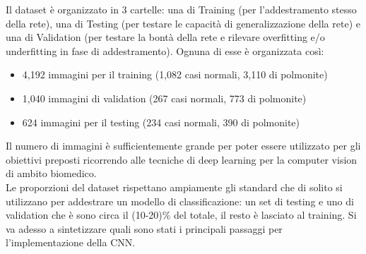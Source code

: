 Il dataset è organizzato in 3 cartelle: una di Training (per l'addestramento stesso della rete), una di Testing (per testare le capacità di generalizzazione della rete) e una di Validation (per testare la bontà della rete e rilevare overfitting e/o underfitting in fase di addestramento). Ognuna di esse è organizzata così: 
\begin{itemize}
    \item 4,192 immagini per il training (1,082 casi normali, 3,110 di polmonite) 
    \item 1,040 immagini di validation (267 casi normali, 773 di polmonite) 
    \item 624 immagini per il testing (234 casi normali, 390 di polmonite) 
\end{itemize}
Il numero di immagini è sufficientemente grande per poter essere utilizzato per gli obiettivi preposti ricorrendo alle tecniche di deep learning per la computer vision di ambito biomedico. \\
Le proporzioni del dataset rispettano ampiamente gli standard che di solito si utilizzano per addestrare un modello di classificazione: un set di testing e uno di validation che è sono circa il (10-20)\% del totale, il resto è lasciato al training.
Si va adesso a sintetizzare quali sono stati i principali passaggi per l’implementazione della CNN.


